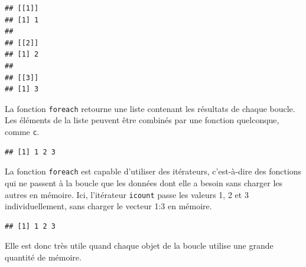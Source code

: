 \documentclass[
  12pt,
  french,
  a4paper,
  extrafontsizes,onecolumn,openright
  ]{memoir}
\newenvironment{Shaded}{\begin{snugshade}}{\end{snugshade}}
\newcommand{\DataTypeTok}[1]{\textcolor[rgb]{0.13,0.29,0.53}{#1}}
\newcommand{\DecValTok}[1]{\textcolor[rgb]{0.00,0.00,0.81}{#1}}
\newcommand{\KeywordTok}[1]{\textcolor[rgb]{0.13,0.29,0.53}{\textbf{#1}}}
\newcommand{\NormalTok}[1]{#1}
\newcommand{\OperatorTok}[1]{\textcolor[rgb]{0.81,0.36,0.00}{\textbf{#1}}}
\newcommand{\StringTok}[1]{\textcolor[rgb]{0.31,0.60,0.02}{#1}}
\begin{document}
\begin{verbatim}
## [[1]]
## [1] 1
## 
## [[2]]
## [1] 2
## 
## [[3]]
## [1] 3
\end{verbatim}

\normalsize

La fonction \texttt{foreach} retourne une liste contenant les résultats de chaque boucle.
Les éléments de la liste peuvent être combinés par une fonction quelconque, comme \texttt{c}.

\scriptsize

\begin{Shaded}
\end{Shaded}

\begin{verbatim}
## [1] 1 2 3
\end{verbatim}

\normalsize

La fonction \texttt{foreach} est capable d'utiliser des itérateurs, c'est-à-dire des fonctions qui ne passent à la boucle que les données dont elle a besoin sans charger les autres en mémoire.
Ici, l'itérateur \texttt{icount} passe les valeurs 1, 2 et 3 individuellement, sans charger le vecteur 1:3 en mémoire.

\scriptsize

\begin{Shaded}
\end{Shaded}

\begin{verbatim}
## [1] 1 2 3
\end{verbatim}

\normalsize

Elle est donc très utile quand chaque objet de la boucle utilise une grande quantité de mémoire.
\end{document}
